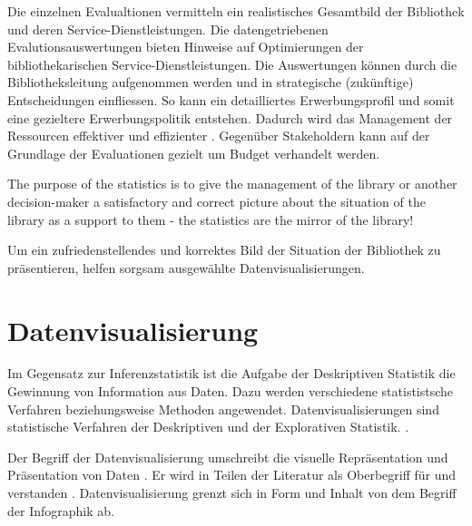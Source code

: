 Die einzelnen Evalualtionen vermitteln ein realistisches Gesamtbild der Bibliothek und deren Service-Dienstleistungen. 
Die datengetriebenen Evalutionsauswertungen bieten Hinweise auf Optimierungen der bibliothekarischen Service-Dienstleistungen. 
Die Auswertungen können durch die Bibliotheksleitung aufgenommen werden und in strategische (zukünftige) Entscheidungen einfliessen. 
So kann ein detailliertes Erwerbungsprofil und somit eine gezieltere Erwerbungspolitik entstehen. 
Dadurch wird das Management der Ressourcen effektiver und effizienter \cite[Vgl.][297]{johnson_peggy_fundamentals_2014}.
Gegenüber Stakeholdern kann auf der Grundlage der Evaluationen gezielt um Budget verhandelt werden.
\begin{displayquote}
    The purpose of the statistics is to give the management of the library or another decision-maker 
    a satisfactory and correct picture about the situation of the library as a support to them - the statistics are the mirror of the library!
    \cite[463]{laitinen_markku_library_2013}
\end{displayquote}

Um ein zufriedenstellendes und korrektes Bild der Situation der Bibliothek zu präsentieren, helfen sorgsam ausgewählte Datenvisualisierungen.



\clearpage
\section{Datenvisualisierung}
\label{chap:two_two}
Im Gegensatz zur Inferenzstatistik ist die Aufgabe der Deskriptiven
Statistik die Gewinnung von Information aus Daten. Dazu werden verschiedene statististsche Verfahren beziehungsweise Methoden angewendet. 
Datenvisualisierungen sind statistische Verfahren der Deskriptiven und der Explorativen Statistik.
\cites[Vgl.][3]{cleff_deskriptive_2011}[Vgl.][7 ff.]{coolidge_statistics_2021}.


Der Begriff der Datenvisualisierung umschreibt die visuelle Repräsentation und Präsentation von Daten \cite[Vgl.][15 ff.]{kirk_data_2019}.
Er wird in Teilen der Literatur als Oberbegriff für  und 
 verstanden \cite[Vgl.][11]{few_now_2009}.
Datenvisualisierung grenzt sich in Form und Inhalt von dem Begriff der Infographik ab. 

